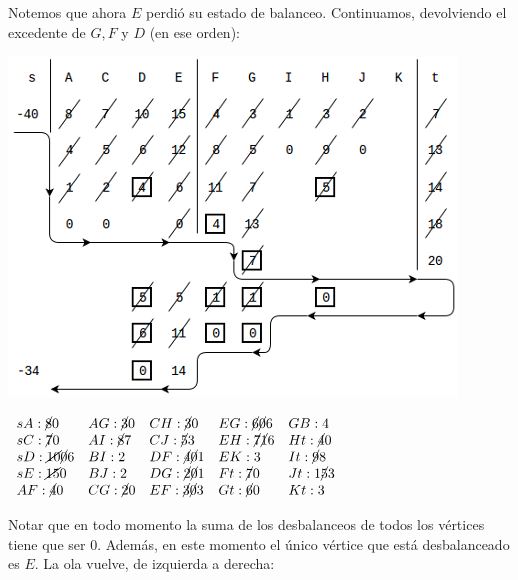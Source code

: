 \documentclass[10pt,a4paper]{article}
\begin{document}
Notemos que ahora $E$ perdió su estado de balanceo. Continuamos, devolviendo el excedente de $G, F$ y $D$ (en ese orden):

\begin{center}

    \begin{adjustbox}{max size={\textwidth}{\textheight}}
        \includegraphics{definitions/wave_b7.jpg}
        \end{adjustbox}
    
\end{center}

\begin{center}
$\begin{array}{lllll} sA:\cancel{8} 0 & AG: \cancel{3}0 & CH: \cancel{3}0 & EG: \cancel{6}\cancel{0}6 & GB:4\\ sC:\cancel{7 } 0 & AI: \cancel{8}7 & CJ: \cancel{5}3 & EH: \cancel{7}\cancel{1}6 & Ht: \cancel{4}0\\ sD:\cancel{10} \cancel{0}6 & BI: 2 & DF:\cancel{4}\cancel{0}1 & EK: 3 & It: \cancel{9}8\\ sE: \cancel{15} 0 &BJ: 2 & DG: \cancel{2}\cancel{0}1 & Ft: \cancel{7}0 & Jt: 1\cancel{5}3\\ AF: \cancel{4}0 & CG: \cancel{2}0 & EF: \cancel{3}\cancel{0}3 & Gt: \cancel{6}0 & Kt: 3\\ \end{array}$
\end{center}

Notar que en todo momento la suma de los desbalanceos de todos los vértices tiene que ser $0$. Además, en este momento el único vértice que está desbalanceado es $E$. La ola vuelve, de izquierda a derecha:
\end{document}

